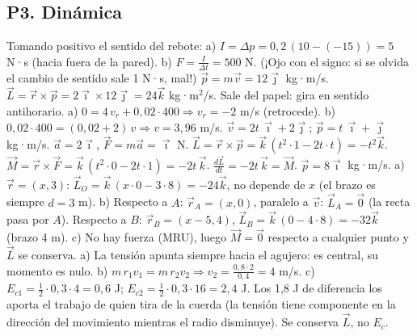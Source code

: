 \documentclass[11pt,a4paper]{article}
\newcommand{\ii}{\vec{\imath}}
\newcommand{\jj}{\vec{\jmath}}
\newcommand{\kk}{\vec{k}}
\begin{document}
\subsection*{P3. Dinámica}
\begin{enumerate}[leftmargin=1.4cm,itemsep=4pt]
 Tomando positivo el sentido del rebote: a) $I=\Delta p=0{,}2\,(10-(-15))=5$ N·s (hacia fuera de la pared). b) $F=\frac{I}{\Delta t}=500$ N. (¡Ojo con el signo: si se olvida el cambio de sentido sale 1 N·s, mal!)
 $\vec p=m\vec v=12\jj$ kg·m/s. $\vec L=\vec r\times\vec p=2\ii\times12\jj=24\kk$ kg·m$^2$/s. Sale del papel: gira en sentido antihorario.
 a) $0=4\,v_r+0{,}02\cdot400\Rightarrow v_r=-2$ m/s (retrocede). b) $0{,}02\cdot400=(0{,}02+2)\,v\Rightarrow v=3{,}96$ m/s.
 $\vec v=2t\,\ii+2\jj$; $\vec p=t\,\ii+\jj$ kg·m/s. $\vec a=2\ii$, $\vec F=m\vec a=\ii$ N. $\vec L=\vec r\times\vec p=\kk\,(t^2\cdot1-2t\cdot t)=-t^2\kk$. $\vec M=\vec r\times\vec F=\kk\,(t^2\cdot0-2t\cdot1)=-2t\,\kk$. $\frac{d\vec L}{dt}=-2t\,\kk=\vec M$. \checkmark
{} $\vec p=8\ii$ kg·m/s. a) $\vec r=(x,3)$: $\vec L_O=\kk\,(x\cdot0-3\cdot8)=-24\kk$, no depende de $x$ (el brazo es siempre $d=3$ m). b) Respecto a $A$: $\vec r_A=(x,0)$, paralelo a $\vec v$: $\vec L_A=\vec 0$ (la recta pasa por $A$). Respecto a $B$: $\vec r_B=(x-5,4)$, $\vec L_B=\kk\,(0-4\cdot8)=-32\kk$ (brazo 4 m). c) No hay fuerza (MRU), luego $\vec M=\vec 0$ respecto a cualquier punto y $\vec L$ se conserva.
 a) La tensión apunta siempre hacia el agujero: es central, su momento es nulo. b) $m\,r_1v_1=m\,r_2v_2\Rightarrow v_2=\frac{0{,}8\cdot2}{0{,}4}=4$ m/s. c) $E_{c1}=\frac12\cdot0{,}3\cdot4=0{,}6$ J; $E_{c2}=\frac12\cdot0{,}3\cdot16=2{,}4$ J. Los 1,8 J de diferencia los aporta el trabajo de quien tira de la cuerda (la tensión tiene componente en la dirección del movimiento mientras el radio disminuye). Se conserva $\vec L$, no $E_c$.
\end{enumerate}
\end{document}
